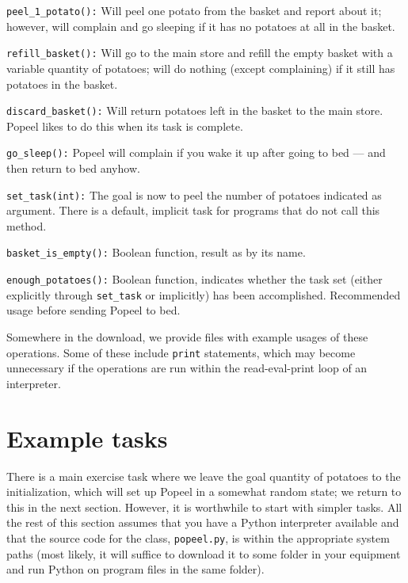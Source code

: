 \documentclass[12pt]{article}
\begin{document}
\begin{description}
\item{{\tt peel_1_potato():}} Will peel one potato
from the basket and report about it; however, will
complain and go sleeping if it has no potatoes at all
in the basket.
\item{{\tt refill_basket():}} Will go to the main
store and refill the empty basket with a variable 
quantity of potatoes; will do nothing (except complaining)
if it still has potatoes in the basket. 
\item{{\tt discard_basket():}} Will return potatoes
left in the basket to the main store. Popeel likes
to do this when its task is complete. 
\item{{\tt go_sleep():}} Popeel will complain if you
wake it up after going to bed --- and then return to
bed anyhow.
\item{{\tt set_task(int):}} The goal is now to peel
the number of potatoes indicated as argument.
There is a default, implicit task for programs 
that do not call this method.
\item{{\tt basket_is_empty():}} Boolean function, 
result as by its name.
\item{{\tt enough_potatoes():}} Boolean function, indicates
whether the task set (either explicitly through {\tt set_task}
or implicitly) has been accomplished. Recommended usage
before sending Popeel to bed. 
\end{description}

Somewhere in the download, we provide files 
with example usages of these operations.
Some of these include {\tt print} statements, 
which may become unnecessary if the
operations are run within the read-eval-print loop of
an interpreter.

\section{Example tasks}

There is a main exercise task where we leave the
goal quantity of potatoes to the initialization,
which will set up Popeel in a somewhat random state;
we return to this in the next section. However, it
is worthwhile to start with simpler tasks. All
the rest of this section assumes that you have
a Python interpreter available and that the
source code for the class, {\tt popeel.py}, is within
the appropriate system paths (most likely, it will
suffice to download it to some folder in your 
equipment and run Python on program files in
the same folder).
\end{document}
